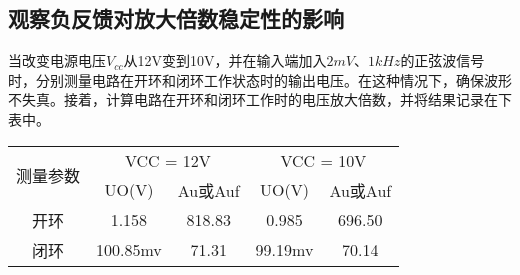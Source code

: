 \documentclass[dvipsnames, svgnames,a4paper,11pt]{article}
\begin{document}
			\subsection{观察负反馈对放大倍数稳定性的影响}
			当改变电源电压$V_{cc}$从12V变到10V，并在输入端加入$2mV$、$1kHz$的正弦波信号时，分别测量电路在开环和闭环工作状态时的输出电压。在这种情况下，确保波形不失真。接着，计算电路在开环和闭环工作时的电压放大倍数，并将结果记录在下表中。
			\begin{table}[H]
				\centering
				\begin{tabular}{|c|c|c|c|c|}
					\hline
					\multirow{2}{*}{测量参数} & \multicolumn{2}{c|}{VCC = 12V} & \multicolumn{2}{c|}{VCC = 10V} \\
					\cline{2-5}
					 & UO(V) & Au或Auf & UO(V) & Au或Auf \\
					\hline
					开环 & 1.158&818.83 &0.985 & 696.50\\
					\hline
					闭环 & 100.85mv&71.31 &99.19mv &70.14 \\
					\hline
				\end{tabular}
			
				\end{table}
\end{document}
